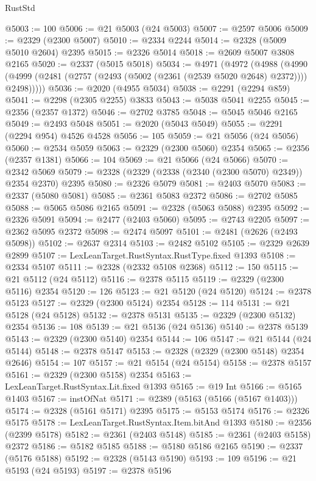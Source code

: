 \begin{lexlean}{RustStd}
\begin{coremodule}
{\begin{coremodule}
{{{{{{{{{{{{{{{{{{{{{{{{{{{{{{{{{{{{{@5003 := 100
@5006 := @21 @5003 (@24 @5003)
@5007 := @2597 @5006
@5009 := @2329 (@2300 @5007)
@5010 := @2334 @2244
@5014 := @2328 (@5009 @5010 @2604) @2395
@5015 := @2326 @5014
@5018 := @2609 @5007 @3808 @2165
@5020 := @2337 (@5015 @5018)
@5034 := @4971
    (@4972
      (@4988
        (@4990 (@4999 (@2481 (@2757 (@2493 (@5002 (@2361 (@2539 @5020 @2648) @2372)))) @2498)))))
@5036 := @2020 (@4955 @5034)
@5038 := @2291 (@2294 @859)
@5041 := @2298 (@2305 @2255) @3833
@5043 := @5038 @5041 @2255
@5045 := @2356 (@2357 @1372)
@5046 := @2702 @3785
@5048 := @5045 @5046 @2165
@5049 := @2493 @5048
@5051 := @2020 (@5043 @5049)
@5055 := @2291 (@2294 @954) @4526 @4528
@5056 := 105
@5059 := @21 @5056 (@24 @5056)
@5060 := @2534 @5059
@5063 := @2329 (@2300 @5060) @2354
@5065 := @2356 (@2357 @1381)
@5066 := 104
@5069 := @21 @5066 (@24 @5066)
@5070 := @2342 @5069
@5079 := @2328 (@2329 (@2338 (@2340 (@2300 @5070) @2349)) @2354 @2370) @2395
@5080 := @2326 @5079
@5081 := @2403 @5070
@5083 := @2337 (@5080 @5081)
@5085 := @2361 @5083 @2372
@5086 := @2702 @5085
@5088 := @5065 @5086 @2165
@5091 := @2328 (@5063 @5088) @2395
@5092 := @2326 @5091
@5094 := @2477 (@2403 @5060)
@5095 := @2743 @2205
@5097 := @2362 @5095 @2372
@5098 := @2474 @5097
@5101 := @2481 (@2626 (@2493 @5098))
@5102 := @2637 @2314
@5103 := @2482 @5102
@5105 := @2329 @2639 @2899
@5107 := LexLeanTarget.RustSyntax.RustType.fixed @1393
@5108 := @2334 @5107
@5111 := @2328 (@2332 @5108 @2368)
@5112 := 150
@5115 := @21 @5112 (@24 @5112)
@5116 := @2378 @5115
@5119 := @2329 (@2300 @5116) @2354
@5120 := 126
@5123 := @21 @5120 (@24 @5120)
@5124 := @2378 @5123
@5127 := @2329 (@2300 @5124) @2354
@5128 := 114
@5131 := @21 @5128 (@24 @5128)
@5132 := @2378 @5131
@5135 := @2329 (@2300 @5132) @2354
@5136 := 108
@5139 := @21 @5136 (@24 @5136)
@5140 := @2378 @5139
@5143 := @2329 (@2300 @5140) @2354
@5144 := 106
@5147 := @21 @5144 (@24 @5144)
@5148 := @2378 @5147
@5153 := @2328 (@2329 (@2300 @5148) @2354 @2646)
@5154 := 107
@5157 := @21 @5154 (@24 @5154)
@5158 := @2378 @5157
@5161 := @2329 (@2300 @5158) @2354
@5163 := LexLeanTarget.RustSyntax.Lit.fixed @1393
@5165 := @19 Int
@5166 := @5165 @1403
@5167 := instOfNat
@5171 := @2389 (@5163 (@5166 (@5167 @1403)))
@5174 := @2328 (@5161 @5171) @2395
@5175 := @5153 @5174
@5176 := @2326 @5175
@5178 := LexLeanTarget.RustSyntax.Item.bitAnd @1393
@5180 := @2356 (@2399 @5178)
@5182 := @2361 (@2403 @5148)
@5185 := @2361 (@2403 @5158) @2372
@5186 := @5182 @5185
@5188 := @5180 @5186 @2165
@5190 := @2337 (@5176 @5188)
@5192 := @2328 (@5143 @5190)
@5193 := 109
@5196 := @21 @5193 (@24 @5193)
@5197 := @2378 @5196
}}}}}}}}}}}}}}}}}}}}}}}}}}}}}}}}}}}}}
\end{coremodule}}
\end{coremodule}
\end{lexlean}

